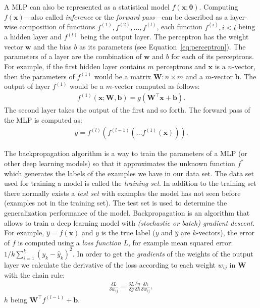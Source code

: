 \documentclass[]{article}
\begin{document}
A MLP can also be represented as a statistical model
$f(\mathbf{x};\mathbf{\theta})$.
Computing $f(\mathbf{x})$---also called \textit{inference} or the
\textit{forward pass}---can be described as a layer-wise composition
of functions $f^{(1)}, f^{(2)}, \dots, f^{(l)}$, each function
$f^{(i)}, i < l$ being a hidden layer and $f^{(l)}$ being the output
layer.
The perceptron has the weight vector $\mathbf{w}$ and the bias
$b$ as its parameters (see Equation~\ref{eq:perceptron}).
The parameters of a layer are the combination of
$\mathbf{w}$ and $b$ for each of its perceptrons.
For example, if the first hidden layer contains $m$ perceptrons and
$\mathbf{x}$ is a $n$-vector, then the parameters of $f^{(1)}$ would
be a matrix $\mathbf{W}: n \times m$ and a $m$-vector $\mathbf{b}$.
The output of layer $f^{(1)}$ would be a $m$-vector computed as
follows:
\begin{align}
  f^{(1)}(\mathbf{x}; \mathbf{W}, \mathbf{b}) =
  g(\mathbf{W}^\top\mathbf{x} + \mathbf{b}).
\end{align}
The second layer takes the output of the first and so forth.
The forward pass of the MLP is computed as:
\begin{align}
  y = f^{(l)}(f^{(l-1)}(\dots f^{(1)}(\mathbf{x}))).
\end{align}

The backpropagation algorithm is a way to train the parameters of a
MLP (or other deep learning models) so that it approximates the
unknown function $f^*$ which generates the labels of the examples
we have in our data set.
The data set used for training a model is called the \textit{training
set}.
In addition to the training set there normally exists a
\textit{test set} with examples the model has not seen before
(examples not in the training set).
The test set is used to determine the generalization performance of
the model.
Backpropagation is an algorithm that allows to train a deep learning
model with \textit{(stochastic or batch) gradient descent}.
For example, $\hat{y} = f(\mathbf{x})$ and $y$ is the true label
($y$ and $\hat{y}$ are $k$-vectors), the error of $f$ is computed
using a \textit{loss function} $L$, for example mean squared error:
$1/k \sum_{i=1}^{k}(y_k - \hat{y}_k)^2$.
In order to get the \textit{gradients} of the weights of the output
layer we calculate the derivative of the loss according to each weight
$w_{ij}$ in $\mathbf{W}$ with the chain rule:
\begin{align}
  \label{eq:chain_rule}
  \frac{\delta L}{\delta w_{ij}} =
    \frac{\delta L}{\delta g}
    \frac{\delta g}{\delta h}
    \frac{\delta h}{\delta w_{ij}},
\end{align}
$h$ being $\mathbf{W}^\top f^{(l-1)} + \mathbf{b}$.
\end{document}
